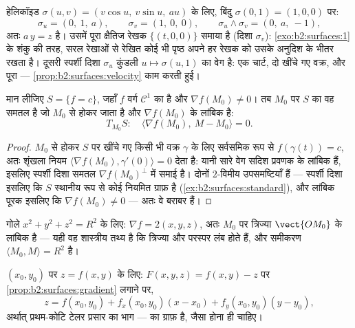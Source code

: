 \begin{example}[हेलिकॉइड का स्पर्श समतल]
\label{ex:b2:surfaces:helicoidtangent}
हेलिकॉइड $\sigma(u, v) = (v\cos u,\ v\sin u,\ au)$ के लिए,
बिंदु $\sigma(0, 1) = (1, 0, 0)$ पर:
\[
\sigma_u = (0,\ 1,\ a), \qquad \sigma_v = (1,\ 0,\ 0),
\qquad
\sigma_u \wedge \sigma_v = (0,\ a,\ -1),
\]
अतः  $a\,y = z$ है। उसमें पूरा क्षैतिज रेखक $\{(t, 0, 0)\}$
समाया है (दिशा $\sigma_v$): \cref{exo:b2:surfaces:1} के शंकु की तरह, सरल
रेखाओं से रेखित कोई भी पृष्ठ अपने हर रेखक को उसके अनुदिश  के भीतर रखता है। दूसरी स्पर्शी दिशा $\sigma_u$ कुंडली $u \mapsto \sigma(u, 1)$
का वेग है: एक चार्ट, दो खींचे गए वक्र, और पूरा   ---
\cref{prop:b2:surfaces:velocity} काम करती हुई।
\end{example}

\begin{proposition}[स्तर पृष्ठ का अभिलंब]\label{prop:b2:surfaces:gradient}
मान लीजिए $S = \{f = c\}$, जहाँ $f$ वर्ग $\mathcal{C}^1$ का है और $\nabla
f(M_0) \neq 0$। तब $M_0$ पर
$S$ का  वह समतल है जो $M_0$ से होकर जाता है और
$\nabla f(M_0)$ के लांबिक है:
\[
T_{M_0}S :\quad
\langle \nabla f(M_0),\ M - M_0\rangle = 0 .
\]
\end{proposition}

\begin{proof}
$M_0$ से होकर $S$ पर खींचे गए किसी भी वक्र $\gamma$ के लिए
सर्वसमिक रूप से $f(\gamma(t)) =
c$, अतः शृंखला नियम $\langle
\nabla f(M_0), \gamma'(0)\rangle = 0$ देता है: यानी सारे
वेग सदिश प्रवणक के लांबिक हैं, इसलिए स्पर्शी दिशा समतल $\nabla f(M_0)^\perp$ में
समाई है। दोनों $2$-विमीय उपसमष्टियाँ हैं --- स्पर्शी दिशा इसलिए कि
$S$ स्थानीय रूप से कोई नियमित ग्राफ़ है
(\cref{ex:b2:surfaces:standard}), और लांबिक पूरक इसलिए कि $\nabla f(M_0) \neq 0$ ---
अतः वे बराबर हैं।
\end{proof}

\begin{example}\label{ex:b2:surfaces:spheretangent}
गोले $x^2 + y^2 + z^2 = R^2$ के लिए: $\nabla f = 2(x, y, z)$,
अतः $M_0$ पर  त्रिज्या $\vect{OM_0}$ के लांबिक है --- यही
वह शास्त्रीय तथ्य है कि त्रिज्या और  परस्पर लंब होते हैं,
और समीकरण $\langle M_0, M\rangle = R^2$ है।
\end{example}

\begin{example}[ग्राफ़ का स्पर्श समतल]\label{ex:b2:surfaces:graphtangent}
$(x_0, y_0)$ पर $z = f(x, y)$ के लिए: $F(x,y,z) = f(x,y) - z$ पर
\cref{prop:b2:surfaces:gradient} लगाने पर,
\[
z = f(x_0, y_0)
+ f_x(x_0, y_0)(x - x_0)
+ f_y(x_0, y_0)(y - y_0) ,
\]
अर्थात् प्रथम-कोटि टेलर प्रसार का  भाग ---   का
ग्राफ़ है, जैसा होना ही चाहिए।
\end{example}

